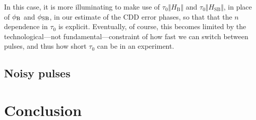 \documentclass[pra,reprint,superscriptaddress]{revtex4-2}
\newcommand{\HB}{H_\mathrm{B}}
\newcommand{\HSB}{H_\mathrm{SB}}
\begin{document}
In this case, it is more illuminating to make use of $\tau_0\Vert \HB\Vert$ and $\tau_0\Vert\HSB\Vert$, in place of $\phi_{\mathrm{B}}$ and $\phi_{\mathrm{SB}}$, in our estimate of the CDD error phases, so that that the $n$ dependence in $\tau_0$ is explicit. 
Eventually, of course, this becomes limited by the technological---not fundamental---constraint of how fast we can switch between pulses, and thus how short $\tau_0$ can be in an experiment.


\subsection{Noisy pulses}




\section{Conclusion}




\acknowledgments
{}



\appendix
\end{document}

